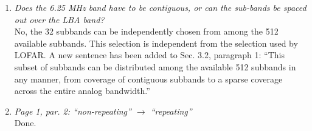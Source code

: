 \documentclass{article}
\begin{document}
\begin {enumerate}
\item  \textit {Does  the  6.25 MHz  band  have  to be  contiguous,  or can  the
  sub-bands be spaced out over the LBA band?}\\

  No, the 32  subbands can be independently chosen from  among the 512 available
  subbands. This  selection is independent from  the selection used by  LOFAR. A
  new  sentence has  been  added to  Sec.  3.2, paragraph  1:  ``This subset  of
  subbands can  be distributed among the  available 512 subbands in  any manner,
  from coverage  of contiguous subbands to  a sparse coverage across  the entire
  analog bandwidth.''

\item    \textit  {Page    1,   par.    2:   ``non-repeating''    $\rightarrow$
  ``repeating''}\\Done.
\end{enumerate}



\end{document}
